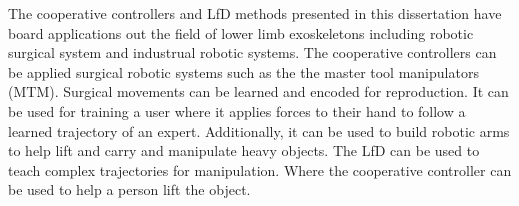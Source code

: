 The cooperative controllers and LfD methods presented in this dissertation have board applications out the field of lower limb exoskeletons including robotic surgical system and industrual robotic systems. The cooperative controllers can be applied surgical robotic systems such as the the master tool manipulators (MTM). Surgical movements can be learned and encoded for reproduction. It can be used for training a user where it applies forces to their hand to follow a learned trajectory of an expert. Additionally, it can be used to build robotic arms to help lift and carry and manipulate heavy objects. The LfD can be used to teach complex trajectories for manipulation. Where the cooperative controller can be used to help a person lift the object. 









